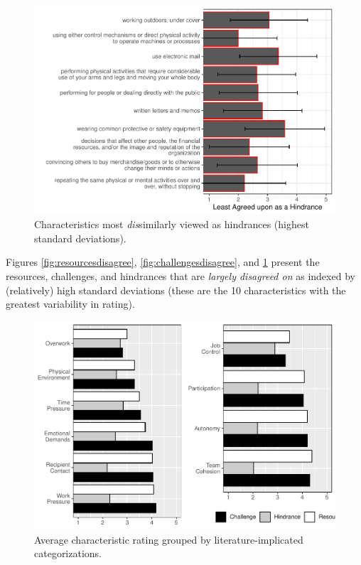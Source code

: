 \documentclass[
  english,
  man]{apa6}
\begin{document}
\begin{figure}
\centering
\includegraphics{Submission_files/figure-latex/hindrancesdisagree-1.pdf}
\caption{\label{fig:hindrancesdisagree}Characteristics most \emph{dis}similarly viewed as hindrances (highest standard deviations).}
\end{figure}

Figures \ref{fig:resourcesdisagree}, \ref{fig:challengesdisagree}, and \ref{fig:hindrancesdisagree} present the resources, challenges, and hindrances that are \emph{largely disagreed on} as indexed by (relatively) high standard deviations (these are the 10 characteristics with the greatest variability in rating).

\begin{figure}
\centering
\includegraphics{Submission_files/figure-latex/scalelevelgraphs-1.pdf}
\caption{\label{fig:scalelevelgraphs}Average characteristic rating grouped by literature-implicated categorizations.}
\end{figure}
\end{document}
